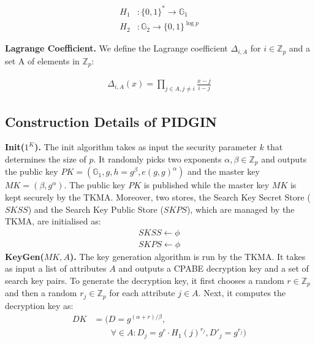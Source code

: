 \documentclass[epsfig,a4paper,11pt,titlepage]{book}
\numberwithin{algorithm}{chapter}
\begin{document}
\begin{align*}
H_1 &:\{0,1\}^{*} \rightarrow \mathbb{G}_1 \\ 
H_2 &: \mathbb{G}_2 \rightarrow \{0,1\}^{\log{p}}
\end{align*}

\noindent \textbf{Lagrange Coefficient.} We define the Lagrange coefficient $\Delta_{i,A}$ for $i \in \mathbb{Z}_p$ and a set A of elements in $\mathbb{Z}_p$: 

\begin{align*}
\Delta_{i,A}(x)=\prod_{j \in A, j \neq i}{\frac{x-j}{i-j}}
\end{align*}

\subsection[Construction Details of PIDGIN]{Construction Details of \gls{PIDGIN}}
\noindent \textbf{Init($1^K$).} The init algorithm takes as input the security parameter $k$ that determines the size of $p$. 
It randomly picks two exponents $\alpha, \beta \in \mathbb{Z}_p$ and outputs the public key $PK = (\mathbb{G}_1, g, h = g^{\beta}, e(g, g)^{\alpha})$ and the master key $MK = (\beta, g^{\alpha})$. 
The public key $PK$ is published while the master key $MK$ is kept securely by the \gls{TKMA}. 
Moreover, two stores, the Search Key Secret Store ($SKSS$) and the Search Key Public Store ($SKPS$), which are managed by the \gls{TKMA}, are initialised as:
\begin{align*}
SKSS \leftarrow \phi \\ 
SKPS \leftarrow \phi
\end{align*}
\textbf{KeyGen($MK, A$).} The key generation algorithm is run by the \gls{TKMA}. 
It takes as input a list of attributes $A$ and outputs a \gls{CPABE} decryption key and a set of search key pairs. 
To generate the decryption key, it first chooses a random $r \in \mathbb{Z}_p$ and then a random $r_j \in \mathbb{Z}_p$ for each attribute $j \in A$. Next, it computes the decryption key as: 
\begin{align*}
DK &= (D = g^{(\alpha + r)/\beta}, \\
&\qquad {} \forall \in A: D_j = g^r \cdot H_1(j)^{r_j}, D'_j = g^{r_j})
\end{align*}
\end{document}

